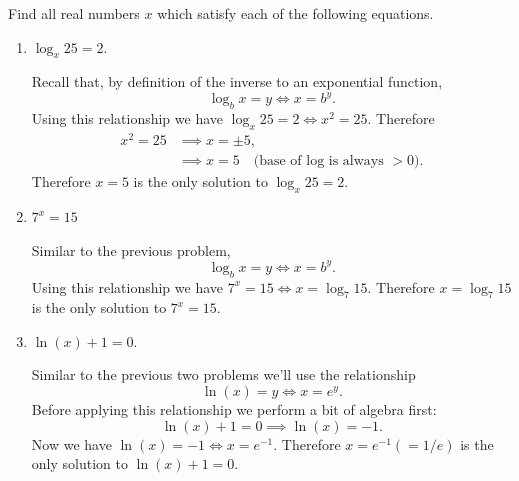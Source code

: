 \documentclass[nooutcomes]{ximera}
\begin{document}
\begin{problem}

  Find all real numbers $x$ which satisfy each of the following equations.
  \begin{enumerate}
    \item
      $\log_x 25 = 2$.
      \begin{freeResponse}
        Recall that, by definition of the inverse to an exponential function,
        \[
        \log_b x = y \iff x = b^y.
        \]
        Using this relationship we have $\log_x 25 = 2 \iff x^2 = 25$.
        Therefore
        \begin{align*}
          x^2 = 25 &\implies x = \pm 5,\\
                   &\implies x = 5 \hspace{1em} \mbox{(base of log is always $>0$)}.
        \end{align*}
        Therefore $x = 5$ is the only solution to $\log_x 25 = 2$.
      \end{freeResponse}


    \item
      $7^x = 15$
      \begin{freeResponse}
        Similar to the previous problem,
        \[
        \log_b x = y \iff x = b^y .
        \]
        Using this relationship we have $7^x = 15  \iff x = \log_{7} 15$.
        Therefore $x = \log_7 15$ is the only solution to $7^x = 15$.
      \end{freeResponse}
      
    \item
      $\ln(x) + 1 = 0$.
      \begin{freeResponse}
        Similar to the previous two problems we'll use the relationship 
        \[
          \ln(x) = y \iff x = e^y.
        \]
        Before applying this relationship we perform a bit of algebra first:
        \[
          \ln(x) + 1 = 0 \implies \ln(x) = -1.
        \]
        Now we have $\ln(x) = -1 \iff x = e^{-1}$.
        Therefore $x = e^{-1} (= 1/e)$ is the only solution to $\ln(x) + 1 = 0$.
      \end{freeResponse}
  \end{enumerate}
\end{problem}
\end{document}
